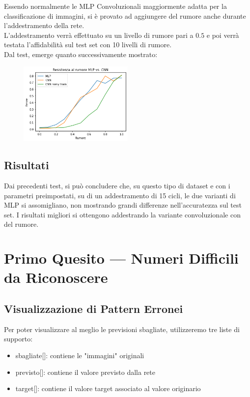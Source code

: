 \documentclass[12pt, a4paper]{article}
\begin{document}
Essendo normalmente le MLP Convoluzionali maggiormente adatta per la classificazione di immagini, si è provato ad aggiungere del rumore anche durante l'addestramento della rete.\\
L'addestramento verrà effettuato su un livello di rumore pari a \(0.5\) e poi verrà testata l'affidabilità sul test set con 10 livelli di rumore.\\
Dal test, emerge quanto successivamente mostrato:
\begin{figure}[H]
    \centering
    \includegraphics[width=0.50\textwidth]{Rumore_Conv_Add.png}
\end{figure}

\subsection{Risultati}
Dai precedenti test, si può concludere che, su questo tipo di dataset e con i parametri preimpostati, su di un addestramento di 15 cicli, le due varianti di MLP si assomigliano, non mostrando grandi differenze nell'accuratezza sul test set. I risultati migliori si ottengono addestrando la variante convoluzionale con del rumore.

\newpage
\section{Primo Quesito --- Numeri Difficili da Riconoscere}
\subsection{Visualizzazione di Pattern Erronei}
Per poter visualizzare al meglio le previsioni sbagliate, utilizzeremo tre liste di supporto:
\begin{itemize}
    \item sbagliate[]: contiene le "immagini" originali
    \item previsto[]: contiene il valore previsto dalla rete
    \item target[]: contiene il valore target associato al valore originario
\end{itemize}
\end{document}
